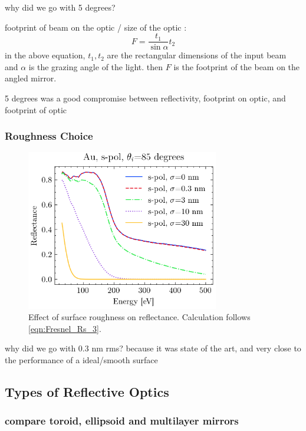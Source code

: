 why did we go with 5 degrees?

footprint of beam on the optic / size of the optic \cite{gibaudSpecularReflectivitySmooth2009}:
\begin{equation}
F = \frac{t_1}{\sin \alpha}t_2
\label{eqn:EM_footprint}
\end{equation}
in the above equation, $t_1, t_2$ are the rectangular dimensions of the input beam and $\alpha$ is the grazing angle of the light. then $F$ is the footprint of the beam on the angled mirror.

5 degrees was a good compromise between reflectivity, footprint on optic, and footprint of optic

\subsubsection{Roughness Choice}
\begin{figure}
	\centering
	\includegraphics[width=0.75\textwidth]{figures/chap2/R_vs_roughness.png}
	\caption{Effect of surface roughness on reflectance. Calculation follows \cref{eqn:Fresnel_Rs_3}.}
	\label{fig:R_vs_roughness.png}
\end{figure}

why did we go with 0.3 nm rms? because it was state of the art, and very close to the performance of a ideal/smooth surface

\subsection{Types of Reflective Optics}

\subsubsection{compare toroid, ellipsoid and multilayer mirrors}

